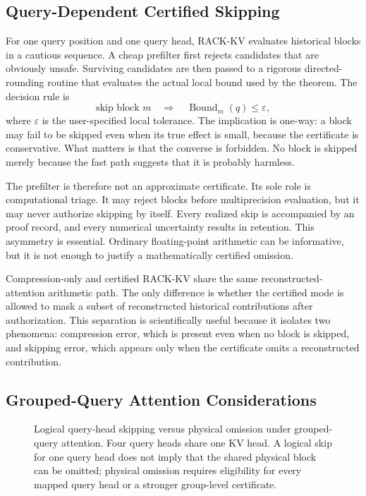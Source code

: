 \subsection{Query-Dependent Certified Skipping}
For one query position and one query head, RACK-KV evaluates historical blocks in a cautious sequence. A cheap \fp{} prefilter first rejects candidates that are obviously unsafe. Surviving candidates are then passed to a rigorous directed-rounding \mpfr{} routine that evaluates the actual local bound used by the theorem. The decision rule is
\begin{equation}
  \text{skip block } m
  \quad \Longrightarrow \quad
  \operatorname{Bound}_m(q) \le \varepsilon,
\end{equation}
where \(\varepsilon\) is the user-specified local tolerance. The implication is one-way: a block may fail to be skipped even when its true effect is small, because the certificate is conservative. What matters is that the converse is forbidden. No block is skipped merely because the fast path suggests that it is probably harmless.

The prefilter is therefore not an approximate certificate. Its sole role is computational triage. It may reject blocks before multiprecision evaluation, but it may never authorize skipping by itself. Every realized skip is accompanied by an \mpfr{} proof record, and every numerical uncertainty results in retention. This asymmetry is essential. Ordinary floating-point arithmetic can be informative, but it is not enough to justify a mathematically certified omission.

Compression-only and certified RACK-KV share the same reconstructed-attention arithmetic path. The only difference is whether the certified mode is allowed to mask a subset of reconstructed historical contributions after authorization. This separation is scientifically useful because it isolates two phenomena: compression error, which is present even when no block is skipped, and skipping error, which appears only when the certificate omits a reconstructed contribution.

\subsection{Grouped-Query Attention Considerations}

\begin{figure}[t]
  \centering
  
  \caption{Logical query-head skipping versus physical omission under grouped-query attention. Four query heads share one KV head. A logical skip for one query head does not imply that the shared physical block can be omitted; physical omission requires eligibility for every mapped query head or a stronger group-level certificate.}
  \label{fig:gqa}
\end{figure}

